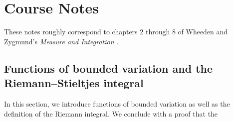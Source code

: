 \chapter{Course Notes}
These notes roughly correspond to chapters 2 through 8 of Wheeden and
Zygmund's \emph{Measure and Integration} \cite{wheeden-zygmund}.

\section{Functions of bounded variation and the Riemann--Stieltjes
  integral}
In this section, we introduce functions of bounded variation as well as the
definition of the Riemann integral. We conclude with a proof that the

